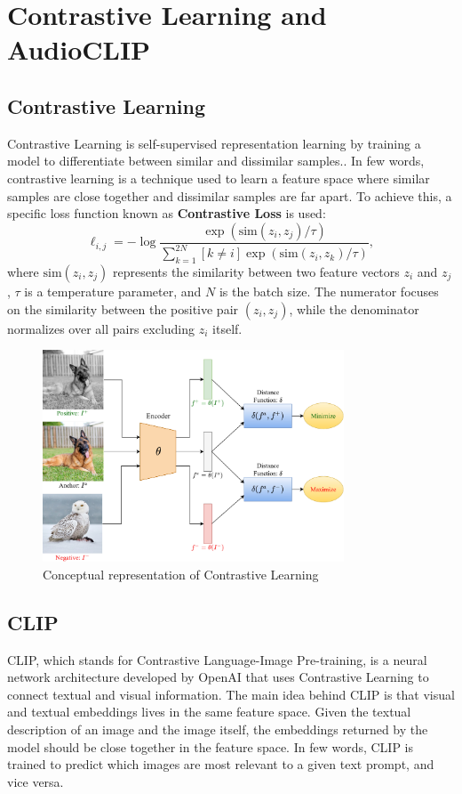 \section{Contrastive Learning and AudioCLIP}

\subsection{Contrastive Learning}
Contrastive Learning is self-supervised representation learning by training a model to differentiate between similar and dissimilar samples.\cite{ContrastiveLearning}. In few words, contrastive learning is a technique used to learn a feature space where similar samples are close together and dissimilar samples are far apart. To achieve this, a specific loss function known as \textbf{Contrastive Loss} is used:
\begin{equation}
\ell_{i,j} = -\log \frac{\exp(\text{sim}(z_i, z_j)/\tau)}{\sum_{k=1}^{2N} [k \neq i] \exp(\text{sim}(z_i, z_k)/\tau)},
\end{equation}
where $\text{sim}(z_i, z_j)$ represents the similarity between two feature vectors $z_i$ and $z_j$, $\tau$ is a temperature parameter, and $N$ is the batch size. The numerator focuses on the similarity between the positive pair $(z_i, z_j)$, while the denominator normalizes over all pairs excluding $z_i$ itself.

\begin{figure}[H]
    \centering
    \includegraphics[width=0.8\textwidth]{img/CLearning.png}
    \caption{Conceptual representation of Contrastive Learning}
\end{figure}

\subsection{CLIP}
CLIP, which stands for Contrastive Language-Image Pre-training, is a neural network architecture developed by OpenAI\cite{CLIP} that uses Contrastive Learning to connect textual and visual information. The main idea behind CLIP is that visual and textual embeddings lives in the same feature space. Given the textual description of an image and the image itself, the embeddings returned by the model should be close together in the feature space. In few words, CLIP is trained to predict which images are most relevant to a given text prompt, and vice versa.

